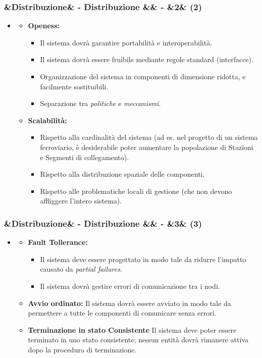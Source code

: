 \documentclass[slidestop,compress,blackandwhite]{beamer}
\newcommand{\itemB}[3]{
	\item \textbf{#1} #2 \vspace{#3}
}
\newcommand{\ii}[1]{\textit{#1}}
\newcommand{\newtitle}[4]{
	#1 
	\ifx&#2&%
	\else
  		\large- #2
	\fi
	\ifx&#3&%
	\else
  		\normalsize- #3
	\fi
	\ifx&#4&%
	\else
  		\normalsize (#4)
	\fi
}
\newcommand{\newframe}[5]{
	\begin{frame}
		\frametitle{\newtitle{#1}{#2}{#3}{#4}}
		#5
	\end{frame}
}
\newcommand{\myitemize}[1]{
	\begin{itemize}\itemsep4pt
	#1
	\end{itemize}
}
\begin{document}
	\newframe{}{Distribuzione}{}{2}{
		\myitemize {
			\item[]
				\myitemize {
					\itemB{Openess:}{
						\myitemize {
							\item Il sistema dovrà garantire portabilità e interoperabilità.
							\item Il sistema dovrà essere fruibile mediante regole standard (interfacce).
							\item Organizzazione del sistema in componenti di dimensione ridotta, e facilmente sostituibili.
							\item Separazione tra \ii{politiche} e \ii{meccanismi}.
						}
					}{0.1cm}
					\itemB{Scalabilità:}{
						\myitemize {
							\item Rispetto alla cardinalità del sistema (ad es. nel progetto di un sistema ferroviario, è desiderabile poter aumentare la popolazione di Stazioni e Segmenti di collegamento).
							\item Rispetto alla distribuzione spaziale delle componenti.
							\item Rispetto alle problematiche locali di gestione (che non devono affliggere l'intero sistema).
						}
					}{0.1cm}
				}
		}
	}
	
	\newframe{}{Distribuzione}{}{3}{
		\myitemize {
			\item[]
				\myitemize {
					\itemB{Fault Tollerance:}{
						\myitemize{
							\item Il sistema deve essere progettato in modo tale da ridurre l'impatto causato da \ii{partial failures}.
							\item Il sistema dovrà gestire errori di comunicazione tra i nodi.
						}
					}{0.1cm}
					
					\itemB{Avvio ordinato:}{Il sistema dovrà essere avviato in modo tale da permettere a tutte le componenti di comunicare senza errori.}{0.1cm}
					\itemB{Terminazione in stato Consistente}{Il sistema deve poter essere terminato in uno stato consistente; nessun entità dovrà rimanere attiva dopo la procedura di terminazione.}{0.1cm}
				}
				
		}
	}
	
\end{document}
